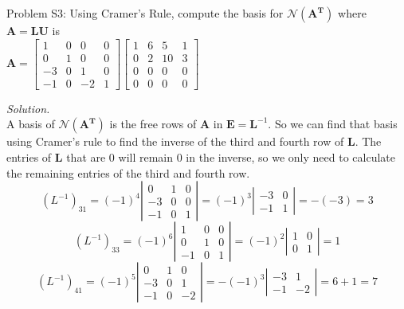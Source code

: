 \documentclass[12pt,pdftex]{article}
\begin{document}
\noindent Problem S3: Using Cramer's Rule, compute the basis for $\mathcal{N}(\mathbf{A^T})$ where $\mathbf{A}= \mathbf{LU}$ is\\
$\mathbf{A} = \left[\begin{array}{cccc} 1 & 0 & 0 & 0\\ 0 & 1 & 0 & 0\\-3 & 0 & 1 & 0\\ -1& 0& -2 & 1\end{array}\right]\left[\begin{array}{cccc} 1 & 6 & 5 & 1\\ 0 & 2 & 10 & 3\\0 & 0 & 0 & 0\\ 0& 0& 0 & 0\end{array}\right]$

\textit{Solution.} \\
A basis of $\mathcal{N}(\mathbf{A^T})$ is the free rows of $\mathbf{A}$ in $\mathbf{E}=\mathbf{L}^{-1}$. So we can find that basis using Cramer's rule to find the inverse of the third and fourth row of $\mathbf{L}$. The entries of $\mathbf{L}$ that are $0$ will remain $0$ in the inverse, so we only need to calculate the remaining entries of the third and fourth row.
\[(L^{-1})_{31}=(-1)^4\left|\begin{array}{ccc} 0 & 1 &0\\ -3 & 0 & 0\\-1 &0 & 1\end{array}\right|=
(-1)^3\left|\begin{array}{ccc} -3 & 0 \\ -1 & 1\end{array}\right|=-(-3)=3\]
\[(L^{-1})_{33}=(-1)^6\left|\begin{array}{ccc} 1 & 0 &0\\ 0 & 1 & 0\\-1 &0 & 1\end{array}\right|=
(-1)^2\left|\begin{array}{ccc} 1 & 0 \\ 0 & 1\end{array}\right|=1\]
\[(L^{-1})_{41}=(-1)^5\left|\begin{array}{ccc} 0 & 1 &0\\ -3 & 0 & 1\\-1 &0 & -2\end{array}\right|=
-(-1)^3\left|\begin{array}{ccc} -3 & 1 \\ -1 & -2\end{array}\right|=6+1=7\]
\end{document}
